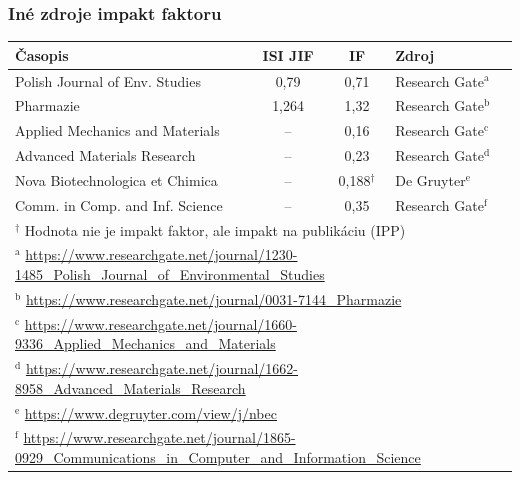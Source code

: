 \documentclass{beamer}
\begin{document}
\begin{frame}[plain]
  \frametitle{Iné zdroje impakt faktoru}
  \begin{table}
    \small\centering
    \begin{tabular}{lccl}
      \toprule
      Časopis & ISI JIF & IF & Zdroj \\
      \midrule
      Polish Journal of Env. Studies  & 0,79  & 0,71           & Research Gate$^{\mathrm{a}}$ \\[0.5ex]
      Pharmazie                       & 1,264 & 1,32           & Research Gate$^{\mathrm{b}}$ \\[0.5ex]
      Applied Mechanics and Materials & --    & 0,16           & Research Gate$^{\mathrm{c}}$ \\[0.5ex]
      Advanced Materials Research     & --    & 0,23           & Research Gate$^{\mathrm{d}}$ \\[0.5ex]
      Nova Biotechnologica et Chimica & --    & 0,188$^\dagger$ & De Gruyter$^{\mathrm{e}}$    \\[0.5ex]
      Comm. in Comp. and Inf. Science & --    & 0,35           & Research Gate$^{\mathrm{f}}$ \\[0.5ex]
      \bottomrule
      \multicolumn{4}{l}{\tiny $^\dagger$ Hodnota nie je impakt faktor, ale impakt na publikáciu (IPP)} \\
      \multicolumn{4}{l}{\tiny $^{\mathrm{a}}$ \url{https://www.researchgate.net/journal/1230-1485\_Polish\_Journal\_of\_Environmental\_Studies}} \\
      \multicolumn{4}{l}{\tiny $^{\mathrm{b}}$ \url{https://www.researchgate.net/journal/0031-7144\_Pharmazie}} \\
      \multicolumn{4}{l}{\tiny $^{\mathrm{c}}$ \url{https://www.researchgate.net/journal/1660-9336\_Applied\_Mechanics\_and\_Materials}} \\
      \multicolumn{4}{l}{\tiny $^{\mathrm{d}}$ \url{https://www.researchgate.net/journal/1662-8958\_Advanced\_Materials\_Research}} \\
      \multicolumn{4}{l}{\tiny $^{\mathrm{e}}$ \url{https://www.degruyter.com/view/j/nbec}} \\
      \multicolumn{4}{l}{\tiny $^{\mathrm{f}}$ \url{https://www.researchgate.net/journal/1865-0929\_Communications\_in\_Computer\_and\_Information\_Science}} \\
    \end{tabular}
  \end{table}
\end{frame}

\end{document}
